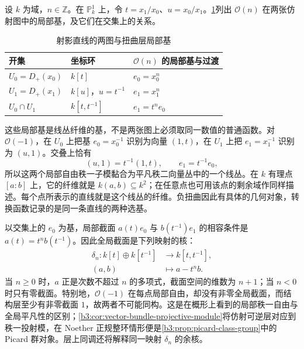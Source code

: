 设 \(k\) 为域，\(n\in\mathbb Z\)。在 \(\mathbb P_k^1\) 上，令 \(t=x_1/x_0\)、\(u=x_0/x_1\)。\cref{b3:tab:projective-line-twist-charts}列出 \(\mathcal O(n)\) 在两张仿射图中的局部基，及它们在交集上的关系。

\begin{table}[htbp]
	\centering
	\caption{射影直线的两图与扭曲层局部基}
	\label{b3:tab:projective-line-twist-charts}
	\begin{tabularx}{\linewidth}{@{}lXX@{}}
		\toprule
		开集 & 坐标环 & \(\mathcal O(n)\) 的局部基与过渡 \\
		\midrule
		\(U_0=D_+(x_0)\) & \(k[t]\) & \(e_0=x_0^n\) \\
		\(U_1=D_+(x_1)\) & \(k[u]\)，\(u=t^{-1}\) & \(e_1=x_1^n\) \\
		\(U_0\cap U_1\) & \(k[t,t^{-1}]\) & \(e_1=t^ne_0\) \\
		\bottomrule
	\end{tabularx}
\end{table}

这些局部基是线丛纤维的基，不是两张图上必须取同一数值的普通函数。对 \(\mathcal O(-1)\)，在 \(U_0\) 上把基 \(e_0=x_0^{-1}\) 识别为向量 \((1,t)\)，在 \(U_1\) 上把 \(e_1=x_1^{-1}\) 识别为 \((u,1)\)。交叠上恰有
\[
	(u,1)=t^{-1}(1,t),\qquad e_1=t^{-1}e_0,
\]
所以这两个局部自由秩一子模黏合为平凡秩二向量丛中的一个线丛。在 \(k\) 有理点 \([a:b]\) 上，它的纤维就是 \(k(a,b)\subseteq k^2\)；在任意点也可用该点的剩余域作同样描述。每个点所表示的直线就是这个线丛的纤维。负扭曲因此有具体的几何对象，转换函数记录的是同一条直线的两种选基。

\ProseParagraphBreak
以交集上的 \(e_0\) 为基，局部截面 \(a(t)e_0\) 与 \(b(t^{-1})e_1\) 的相容条件是 \(a(t)=t^n b(t^{-1})\)。因此全局截面是下列映射的核：
\begin{equation}\label{b3:eq:projective-line-twist-cech-map}
	\begin{aligned}
		\delta_n:k[t]\oplus k[t^{-1}]&\longrightarrow k[t,t^{-1}],\\
		(a,b)&\longmapsto a-t^n b.
	\end{aligned}
\end{equation}
当 \(n\ge0\) 时，\(a\) 正是次数不超过 \(n\) 的多项式，截面空间的维数为 \(n+1\)；当 \(n<0\) 时只有零截面。特别地，\(\mathcal O(-1)\) 在每点局部自由，却没有非零全局截面，而结构层至少有非零截面 \(1\)，故两者不可能同构。这是在概形上看到的局部秩一自由与全局平凡性的区别；\cref{b3:cor:vector-bundle-projective-module}将仿射可逆层对应到秩一投射模，在 Noether 正规整环情形便是\cref{b3:prop:picard-class-group}中的 Picard 群对象。层上同调还将解释同一映射 \(\delta_n\) 的余核。

